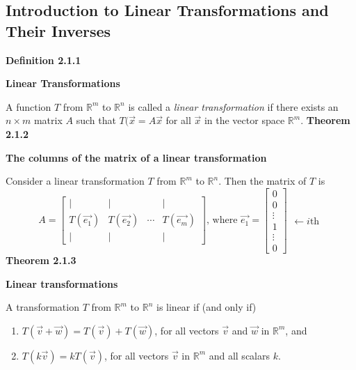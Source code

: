 \subsection{Introduction to Linear Transformations and Their Inverses}
\textbf{Definition 2.1.1}\\
\par\noindent\textbf{Linear Transformations}
\par\noindent A function $T$ from $\mathbb{R}^{m}$ to $\mathbb{R}^{n}$ is called a \textit{linear transformation} if there exists an $n\times{}m$ matrix $A$ such that $T(\vec{x}=A\vec{x}$ for all $\vec{x}$ in the vector space $\mathbb{R}^{m}$.
\textbf{Theorem 2.1.2}\\
\par\noindent\textbf{The columns of the matrix of a linear transformation}
\par\noindent Consider a linear transformation $T$ from $\mathbb{R}^{m}$ to $\mathbb{R}^{n}$. Then the matrix of $T$ is
\[A=\left[\begin{array}{cccc}|&|& &|\\ T(\vec{e_{1}})& T(\vec{e_{2}})& \cdots{}& T(\vec{e_{m}})\\ |&|& &|\end{array}\right]\textrm{, where }\vec{e_{1}}=\left[\begin{array}{c}0\\ 0\\ \vdots{}\\ 1\\ \vdots{}\\ 0\end{array}\right]\begin{array}{l}\\ \\ \\ \leftarrow{}i\textrm{th}\\ \\ \\ \end{array}\]
\textbf{Theorem 2.1.3}\\
\par\noindent\textbf{Linear transformations}
\par\noindent A transformation $T$ from $\mathbb{R}^{m}$ to $\mathbb{R}^{n}$ is linear if (and only if)
\renewcommand{\labelenumi}{\textbf{\alph{enumi}.}}
\begin{enumerate}
\item $T(\vec{v}+\vec{w})=T(\vec{v})+T(\vec{w})$, for all vectors $\vec{v}$ and $\vec{w}$ in $\mathbb{R}^{m}$, and
\item $T(k\vec{v})=kT(\vec{v})$, for all vectors $\vec{v}$ in $\mathbb{R}^{m}$ and all scalars $k$.
\end{enumerate}
\pagebreak

